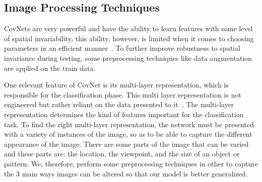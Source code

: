 \documentclass[12pt, a4paper,oneside]{report}
\begin{document}
\subsection{Image Processing Techniques}
CovNets are very powerful and have the ability to learn features with some level of spatial invariability, this ability, however, is limited when it comes to choosing parameters in an efficient manner~\cite{jaderberg2015spatial}. To further improve robustness to spatial invariance during testing, some preprocessing techniques like data augmentation are applied on the train data.

One relevant feature of CovNet is its multi-layer representation, which is responsible for the classification phase. This multi layer representation is not engineered but rather reliant on the data presented to it~\cite{van2017learning}. The multi-layer representation determines the kind of features important for the classification task. To find the right multi-layer representation, the network must be presented with a variety of instances of the image, so as to be able to capture the different appearance of the image. There are some parts of the image that can be varied and these parts are: the location, the viewpoint, and the size of an object or pattern. We, therefore, perform some preprocessing techniques in other to capture the 3 main ways images can be altered so that our model is better generalized. 
\end{document}
